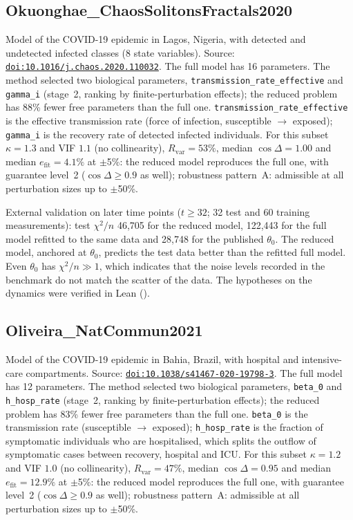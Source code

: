\subsection*{Okuonghae\_ChaosSolitonsFractals2020}

Model of the COVID-19 epidemic in Lagos, Nigeria, with detected and undetected infected classes (8 state variables). Source: \href{https://doi.org/10.1016/j.chaos.2020.110032}{\nolinkurl{doi:10.1016/j.chaos.2020.110032}}. The full model has 16 parameters. The method selected two biological parameters, \texttt{transmission\_rate\_effective} and \texttt{gamma\_i} (stage~2, ranking by finite-perturbation effects); the reduced problem has 88\% fewer free parameters than the full one. \texttt{transmission\_rate\_effective} is the effective transmission rate (force of infection, susceptible $\to$ exposed); \texttt{gamma\_i} is the recovery rate of detected infected individuals. For this subset $\kappa=1.3$ and VIF $1.1$ (no collinearity), $R_{\mathrm{var}}=53\%$, median $\cos\Delta=1.00$ and median $e_{\mathrm{fit}}=4.1\%$ at $\pm$5\%: the reduced model reproduces the full one, with guarantee level~2 ($\cos\Delta\ge0.9$ as well); robustness pattern~A: admissible at all perturbation sizes up to $\pm$50\%.

External validation on later time points ($t\ge32$; 32 test and 60 training measurements): test $\chi^2/n$ 46,705 for the reduced model, 122,443 for the full model refitted to the same data and 28,748 for the published $\theta_0$. The reduced model, anchored at $\theta_0$, predicts the test data better than the refitted full model. Even $\theta_0$ has $\chi^2/n\gg1$, which indicates that the noise levels recorded in the benchmark do not match the scatter of the data. The hypotheses on the dynamics were verified in Lean ().

\subsection*{Oliveira\_NatCommun2021}

Model of the COVID-19 epidemic in Bahia, Brazil, with hospital and intensive-care compartments. Source: \href{https://doi.org/10.1038/s41467-020-19798-3}{\nolinkurl{doi:10.1038/s41467-020-19798-3}}. The full model has 12 parameters. The method selected two biological parameters, \texttt{beta\_0} and \texttt{h\_hosp\_rate} (stage~2, ranking by finite-perturbation effects); the reduced problem has 83\% fewer free parameters than the full one. \texttt{beta\_0} is the transmission rate (susceptible $\to$ exposed); \texttt{h\_hosp\_rate} is the fraction of symptomatic individuals who are hospitalised, which splits the outflow of symptomatic cases between recovery, hospital and ICU. For this subset $\kappa=1.2$ and VIF $1.0$ (no collinearity), $R_{\mathrm{var}}=47\%$, median $\cos\Delta=0.95$ and median $e_{\mathrm{fit}}=12.9\%$ at $\pm$5\%: the reduced model reproduces the full one, with guarantee level~2 ($\cos\Delta\ge0.9$ as well); robustness pattern~A: admissible at all perturbation sizes up to $\pm$50\%.

